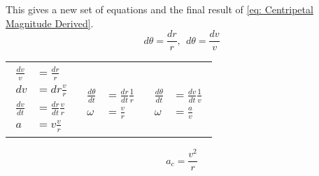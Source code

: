 \documentclass[main.tex]{subfiles}
\begin{document}
                    This gives a new set of equations and the final result of \eqref{eq: Centripetal Magnitude Derived}.
                    \begin{equation*}
                        d\theta = \frac{dr}{r} , \  \  d\theta = \frac{dv}{v}
                    \end{equation*}
                    \begin{center}
                        \begin{tabular}{p{3cm} p{3cm} p{3cm}}
                            \parbox{3cm}{\begin{align*}
                                \frac{dv}{v} &= \frac{dr}{r} \\[-1em]
                                dv &= dr\frac{v}{r} \\[-1em]
                                \frac{dv}{dt} &= \frac{dr}{dt} \frac{v}{r} \\[-1em]
                                a &= v\frac{v}{r}
                            \end{align*}}
                            &
                            \parbox{3cm}{\begin{align*}
                                & \\[-0.4em]
                                & \\
                                \frac{d\theta}{dt} &= \frac{dr}{dt} \frac{1}{r}\\[-1em]
                                \omega &= \frac{v}{r}
                            \end{align*}}
                            &
                            \parbox{3cm}{\begin{align*}
                                & \\[-0.4em]
                                & \\
                                \frac{d\theta}{dt} &= \frac{dv}{dt} \frac{1}{v} \\[-1em]
                                \omega &= \frac{a}{v}
                            \end{align*}} \vfill
                        \end{tabular}
                    \end{center}
                    

                    \begin{equation}
                        a_c = \frac{v^2}{r}
                        \label{eq: Centripetal Magnitude Derived}
                    \end{equation}
\end{document}
